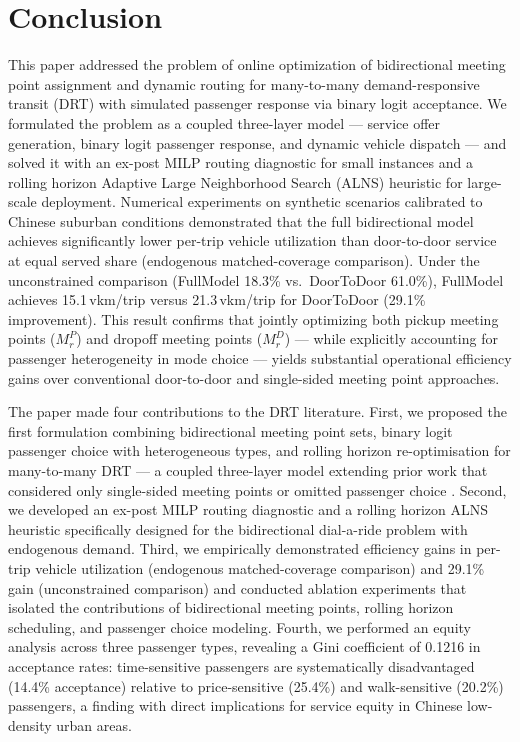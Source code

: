 \section{Conclusion}
\label{sec:conclusion}

This paper addressed the problem of online optimization of bidirectional meeting point
assignment and dynamic routing for many-to-many demand-responsive transit (DRT) with
simulated passenger response via binary logit acceptance.
We formulated the problem as a coupled three-layer model — service offer generation,
binary logit passenger response, and dynamic vehicle dispatch — and solved it
with an ex-post MILP routing diagnostic for small instances and a
rolling horizon Adaptive Large Neighborhood Search (ALNS) heuristic for large-scale
deployment.
Numerical experiments on synthetic scenarios calibrated to Chinese suburban conditions
demonstrated that the full bidirectional model achieves
significantly lower per-trip vehicle utilization than door-to-door service at equal
served share (endogenous matched-coverage comparison).
Under the unconstrained comparison (FullModel 18.3\% vs.\ DoorToDoor 61.0\%), FullModel achieves
15.1\,vkm/trip versus 21.3\,vkm/trip for DoorToDoor (29.1\% improvement).
This result confirms that jointly optimizing both pickup meeting points ($M_r^P$) and
dropoff meeting points ($M_r^D$) — while explicitly accounting for passenger heterogeneity
in mode choice — yields substantial operational efficiency gains over conventional
door-to-door and single-sided meeting point approaches.

The paper made four contributions to the DRT literature.
First, we proposed the first formulation combining bidirectional meeting
point sets, binary logit passenger choice with heterogeneous types, and
rolling horizon re-optimisation for many-to-many DRT — a coupled three-layer model extending prior work
that considered only single-sided meeting points \citep{cortenbach2024} or omitted
passenger choice \citep{wu2025}.
Second, we developed an ex-post MILP routing diagnostic and a rolling horizon ALNS heuristic
specifically designed for the bidirectional dial-a-ride problem with endogenous demand.
Third, we empirically demonstrated efficiency gains in per-trip vehicle utilization
(endogenous matched-coverage comparison) and 29.1\% gain (unconstrained comparison) and conducted
ablation experiments that isolated the contributions of bidirectional meeting points,
rolling horizon scheduling, and passenger choice modeling.
Fourth, we performed an equity analysis across three passenger types, revealing a Gini
coefficient of 0.1216 in acceptance rates: time-sensitive passengers are systematically
disadvantaged (14.4\% acceptance) relative to price-sensitive (25.4\%) and walk-sensitive
(20.2\%) passengers, a finding with direct implications for service equity in Chinese
low-density urban areas.

